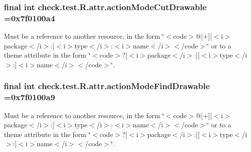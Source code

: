 \subsubsection[{action\+Mode\+Cut\+Drawable}]{\setlength{\rightskip}{0pt plus 5cm}final int check.\+test.\+R.\+attr.\+action\+Mode\+Cut\+Drawable =0x7f0100a4\hspace{0.3cm}{\ttfamily [static]}}\label{classcheck_1_1test_1_1_r_1_1attr_a691190563ca01ec16e2456ac64fc5a72}
Must be a reference to another resource, in the form \char`\"{}$<$code$>$@\mbox{[}+\mbox{]}\mbox{[}$<$i$>$package$<$/i$>$\+:\mbox{]}$<$i$>$type$<$/i$>$\+:$<$i$>$name$<$/i$>$$<$/code$>$\char`\"{} or to a theme attribute in the form \char`\"{}$<$code$>$?\mbox{[}$<$i$>$package$<$/i$>$\+:\mbox{]}\mbox{[}$<$i$>$type$<$/i$>$\+:\mbox{]}$<$i$>$name$<$/i$>$$<$/code$>$\char`\"{}. \hypertarget{classcheck_1_1test_1_1_r_1_1attr_a535b66e1a04df112a1eb7fc3a8c05b9a}{}
\subsubsection[{action\+Mode\+Find\+Drawable}]{\setlength{\rightskip}{0pt plus 5cm}final int check.\+test.\+R.\+attr.\+action\+Mode\+Find\+Drawable =0x7f0100a9\hspace{0.3cm}{\ttfamily [static]}}\label{classcheck_1_1test_1_1_r_1_1attr_a535b66e1a04df112a1eb7fc3a8c05b9a}
Must be a reference to another resource, in the form \char`\"{}$<$code$>$@\mbox{[}+\mbox{]}\mbox{[}$<$i$>$package$<$/i$>$\+:\mbox{]}$<$i$>$type$<$/i$>$\+:$<$i$>$name$<$/i$>$$<$/code$>$\char`\"{} or to a theme attribute in the form \char`\"{}$<$code$>$?\mbox{[}$<$i$>$package$<$/i$>$\+:\mbox{]}\mbox{[}$<$i$>$type$<$/i$>$\+:\mbox{]}$<$i$>$name$<$/i$>$$<$/code$>$\char`\"{}. \hypertarget{classcheck_1_1test_1_1_r_1_1attr_aff7427a6bcd20189d4b6af36b92fccdd}{}
